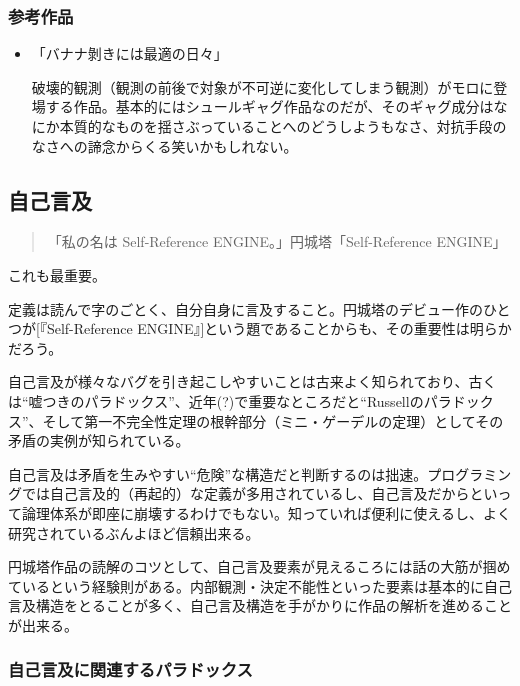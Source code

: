 \documentclass[10pt, a5paper, twoside]{jsarticle}
\begin{document}
			\subsubsection*{参考作品}
			
			\begin{itemize}
				
				\item「バナナ剝きには最適の日々」

					破壊的観測（観測の前後で対象が不可逆に変化してしまう観測）がモロに登場する作品。基本的にはシュールギャグ作品なのだが、そのギャグ成分はなにか本質的なものを揺さぶっていることへのどうしようもなさ、対抗手段のなさへの諦念からくる笑いかもしれない。

			\end{itemize}

		\subsection{自己言及}

			\begin{quote}

				「私の名は Self-Reference ENGINE。」\hspace{\fill}円城塔「Self-Reference ENGINE」

			\end{quote}

			これも最重要。

			定義は読んで字のごとく、自分自身に言及すること。円城塔のデビュー作のひとつが[『Self-Reference ENGINE』]という題であることからも、その重要性は明らかだろう。
			
			自己言及が様々なバグを引き起こしやすいことは古来よく知られており、古くは“嘘つきのパラドックス”、近年(?)で重要なところだと“Russellのパラドックス”、そして第一不完全性定理の根幹部分（ミニ・ゲーデルの定理）としてその矛盾の実例が知られている。

			自己言及は矛盾を生みやすい“危険”な構造だと判断するのは拙速。プログラミングでは自己言及的（再起的）な定義が多用されているし、自己言及だからといって論理体系が即座に崩壊するわけでもない。知っていれば便利に使えるし、よく研究されているぶんよほど信頼出来る。

			円城塔作品の読解のコツとして、自己言及要素が見えるころには話の大筋が掴めているという経験則がある。内部観測・決定不能性といった要素は基本的に自己言及構造をとることが多く、自己言及構造を手がかりに作品の解析を進めることが出来る。

			\subsubsection*{自己言及に関連するパラドックス}
\end{document}
